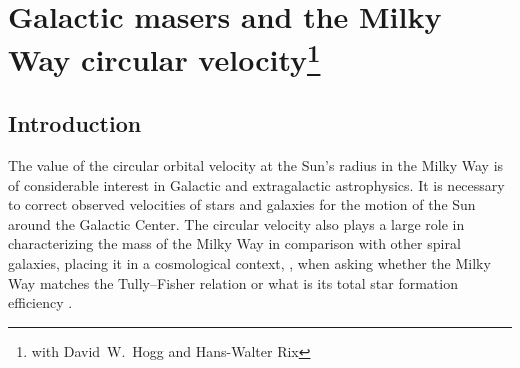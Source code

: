 \chapter[Galactic masers and the Milky Way circular velocity]{Galactic masers and the Milky Way circular velocity\protect\footnote{with David~W.~Hogg and Hans-Walter Rix}\label{chap:masers}}



\section{Introduction}

The value of the circular orbital velocity at the Sun's radius in the
Milky Way is of considerable interest in Galactic and extragalactic
astrophysics. It is necessary to correct observed velocities of stars
and galaxies for the motion of the Sun around the Galactic Center. The
circular velocity also plays a large role in characterizing the mass
of the Milky Way in comparison with other spiral galaxies, placing it
in a cosmological context, \eg, when asking whether the Milky Way
matches the Tully--Fisher relation \citep[\eg][]{Klypin02a,Flynn06a} or
what is its total star formation efficiency
\citep[\eg,][]{Smith07a,Xue08a}.

